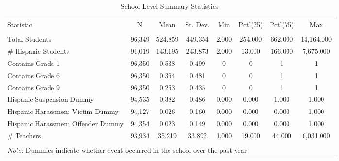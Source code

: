 
\begin{table}[!htbp] \centering 
  \caption{School Level Summary Statistics} 
  \label{} 
\begin{tabular}{@{\extracolsep{5pt}}lccccccc} 
\\[-1.8ex]\hline 
\hline \\[-1.8ex] 
Statistic & \multicolumn{1}{c}{N} & \multicolumn{1}{c}{Mean} & \multicolumn{1}{c}{St. Dev.} & \multicolumn{1}{c}{Min} & \multicolumn{1}{c}{Pctl(25)} & \multicolumn{1}{c}{Pctl(75)} & \multicolumn{1}{c}{Max} \\ 
\hline \\[-1.8ex] 
Total Students & 96,349 & 524.859 & 449.354 & 2.000 & 254.000 & 662.000 & 14,164.000 \\ 
\# Hispanic Students & 91,019 & 143.195 & 243.873 & 2.000 & 13.000 & 166.000 & 7,675.000 \\ 
Contains Grade 1 & 96,350 & 0.538 & 0.499 & 0 & 0 & 1 & 1 \\ 
Contains Grade 6 & 96,350 & 0.364 & 0.481 & 0 & 0 & 1 & 1 \\ 
Contains Grade 9 & 96,350 & 0.253 & 0.435 & 0 & 0 & 1 & 1 \\ 
Hispanic Suspension Dummy & 94,535 & 0.382 & 0.486 & 0.000 & 0.000 & 1.000 & 1.000 \\ 
Hispanic Harassment Victim Dummy & 94,127 & 0.026 & 0.160 & 0.000 & 0.000 & 0.000 & 1.000 \\ 
Hispanic Harassment Offender Dummy & 94,354 & 0.023 & 0.149 & 0.000 & 0.000 & 0.000 & 1.000 \\ 
\# Teachers & 93,934 & 35.219 & 33.892 & 1.000 & 19.000 & 44.000 & 6,031.000 \\ 
\hline \\[-1.8ex] 
\multicolumn{8}{l}{\textit{Note:} Dummies indicate whether event occurred in the school over the past year} \\ 
\end{tabular} 
\end{table} 
